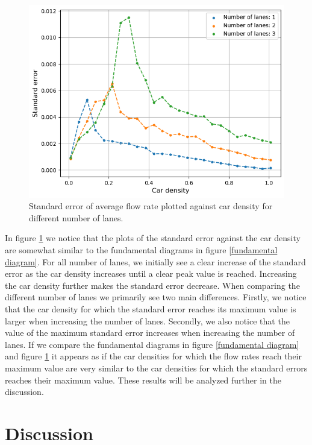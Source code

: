 \documentclass[a4paper,12pt]{article}
\begin{document}
\begin{figure}[H]
    \centering
    \includegraphics[scale=0.9]{Images/standard error 120.png}
    \caption{Standard error of average flow rate plotted against car density for different number of lanes.}
    \label{standard error}
\end{figure}

In figure \ref*{standard error} we notice that the plots of the standard error against the car density are somewhat similar to the fundamental diagrams
in figure \ref*{fundamental diagram}. For all number of lanes, we initially see a clear increase of the standard error as the car density increases
until a clear peak value is reached. Increasing the car density further makes the standard error decrease. When comparing the different number of lanes we primarily
see two main differences. Firstly, we notice that the car density for which the standard error reaches its maximum value is larger when increasing the number of lanes.
Secondly, we also notice that the value of the maximum standard error increases when increasing the number of lanes. If we compare the fundamental
diagrams in figure \ref*{fundamental diagram} and figure \ref*{standard error} it appears as if the car densities for which the flow rates reach their maximum
value are very similar to the car densities for which the standard errors reaches their maximum value. These results will be analyzed further in the discussion.

\section*{Discussion}
\end{document}
